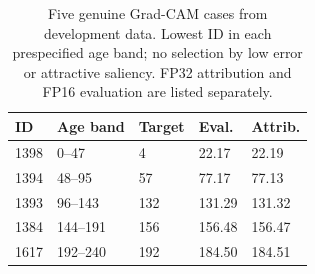 \begin{table}[!t]
\centering\footnotesize
\caption{Five genuine Grad-CAM cases from development data. Lowest ID in each prespecified age band; no selection by low error or attractive saliency. FP32 attribution and FP16 evaluation are listed separately.}
\label{tab:prelim_cam_cases}
\begin{tabularx}{\columnwidth}{@{}p{27mm}XXXX@{}}
\toprule
ID & Age band & Target & Eval. & Attrib. \\
\midrule
1398 & 0--47 & 4 & 22.17 & 22.19 \\
1394 & 48--95 & 57 & 77.17 & 77.13 \\
1393 & 96--143 & 132 & 131.29 & 131.32 \\
1384 & 144--191 & 156 & 156.48 & 156.47 \\
1617 & 192--240 & 192 & 184.50 & 184.51 \\
\bottomrule
\end{tabularx}
\end{table}